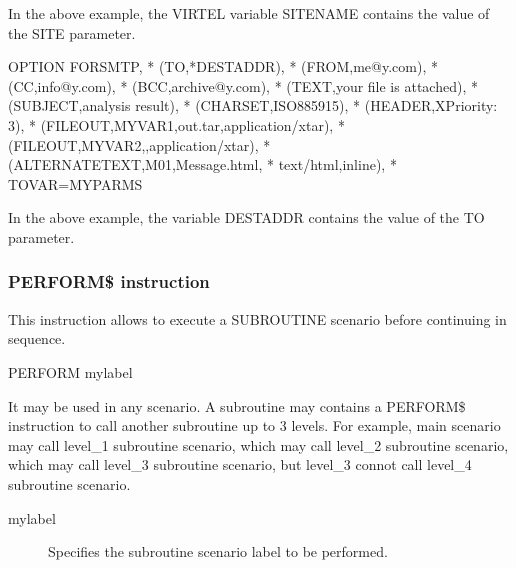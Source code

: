 \documentclass[letterpaper,10pt,english]{sphinxmanual}
\begin{document}
In the above example, the VIRTEL variable SITENAME contains the value of the SITE parameter.

\begin{sphinxVerbatim}[commandchars=\\\{\}]
OPTION\PYGZdl{} FOR\PYGZhy{}SMTP,                                      *
    (TO,\PYGZsq{}*DESTADDR\PYGZsq{}),                                  *
    (FROM,\PYGZsq{}me@y.com\PYGZsq{}),                                 *
    (CC,\PYGZsq{}info@y.com\PYGZsq{}),                                 *
    (BCC,\PYGZsq{}archive@y.com\PYGZsq{}),                             *
    (TEXT,\PYGZsq{}your file is attached\PYGZsq{}),                    *
    (SUBJECT,\PYGZsq{}analysis result\PYGZsq{}),                       *
    (CHARSET,\PYGZsq{}ISO\PYGZhy{}8859\PYGZhy{}15\PYGZsq{}),                           *
    (HEADER,\PYGZsq{}X\PYGZhy{}Priority: 3\PYGZsq{}),                          *
    (FILE\PYGZhy{}OUT,\PYGZsq{}MYVAR1\PYGZsq{},\PYGZsq{}out.tar\PYGZsq{},\PYGZsq{}application/x\PYGZhy{}tar\PYGZsq{}), *
    (FILE\PYGZhy{}OUT,\PYGZsq{}MYVAR2\PYGZsq{},,\PYGZsq{}application/x\PYGZhy{}tar\PYGZsq{}),          *
    (ALTERNATE\PYGZhy{}TEXT,\PYGZsq{}M01\PYGZsq{},\PYGZsq{}Message.html\PYGZsq{},              *
    \PYGZsq{}text/html\PYGZsq{},\PYGZsq{}inline\PYGZsq{}),                             *
    TOVAR=\PYGZsq{}MYPARMS\PYGZsq{}
\end{sphinxVerbatim}

In the above example, the variable DESTADDR contains the value of the TO parameter.


\subsubsection{PERFORM\$ instruction}
\label{\detokenize{User_Guide:perform-instruction}}
This instruction allows to execute a SUBROUTINE scenario before continuing in sequence.

\begin{sphinxVerbatim}[commandchars=\\\{\}]
PERFORM\PYGZdl{} mylabel
\end{sphinxVerbatim}

It may be used in any scenario. A subroutine may contains a PERFORM\$ instruction to call another subroutine up to 3
levels. For example, main scenario may call level\_1 subroutine scenario, which may call level\_2 subroutine scenario,
which may call level\_3 subroutine scenario, but level\_3 connot call level\_4 subroutine scenario.
\begin{description}
\item[{mylabel}] \leavevmode
Specifies the subroutine scenario label to be performed.

\end{description}
\end{document}
